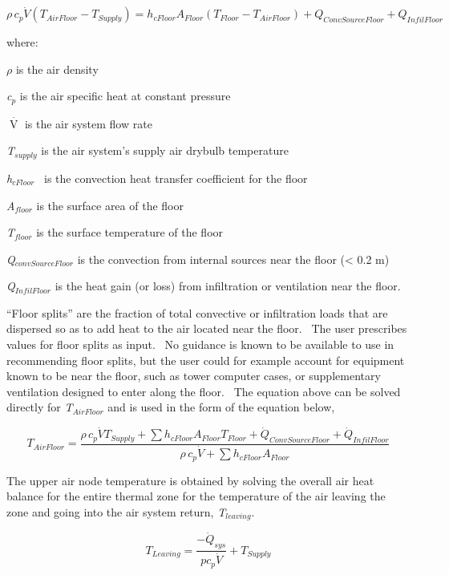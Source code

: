 \begin{equation}
\rho \,{c_p}\dot V({T_{AirFloor}} - {T_{Supply}}) = {h_{cFloor}}{A_{Floor}}({T_{Floor}} - {T_{AirFloor}}) + {Q_{ConvSourceFloor}} + {Q_{InfilFloor}}
\end{equation}

where:

\emph{\(\rho\)} is the air density

\emph{c\(_{p}\)} is the air specific heat at constant pressure

\(\mathop V\limits^\cdot\) is the air system flow rate

\emph{T\(_{supply}\)} is the air system's supply air drybulb temperature

\emph{h\(_{cFloor}\)} ~is the convection heat transfer coefficient for the floor

\emph{A\(_{floor}\)} is the surface area of the floor

\emph{T\(_{floor}\)} is the surface temperature of the floor

\emph{Q\(_{convSourceFloor}\)} is the convection from internal sources near the floor (\textless{} 0.2 m)

\emph{Q\(_{InfilFloor}\)} is the heat gain (or loss) from infiltration or ventilation near the floor.

``Floor splits'' are the fraction of total convective or infiltration loads that are dispersed so as to add heat to the air located near the floor.~ The user prescribes values for floor splits as input.~ No guidance is known to be available to use in recommending floor splits, but the user could for example account for equipment known to be near the floor, such as tower computer cases, or supplementary ventilation designed to enter along the floor.~ The equation above can be solved directly for \emph{T\(_{AirFloor}\)} and is used in the form of the equation below,

\begin{equation}
{T_{AirFloor}} = \frac{{\rho \,{c_p}\dot V{T_{Supply}} + \sum {{h_{cFloor}}{A_{Floor}}{T_{Floor}}}  + {{\dot Q}_{ConvSourceFloor}} + {{\dot Q}_{InfilFloor}}}}{{\rho \,{c_p}\dot V + \sum {{h_{cFloor}}{A_{Floor}}} }}
\end{equation}

The upper air node temperature is obtained by solving the overall air heat balance for the entire thermal zone for the temperature of the air leaving the zone and going into the air system return, \emph{T\(_{leaving}\)}.

\begin{equation}
{T_{Leaving}} = \frac{{ - {{\dot Q}_{sys}}}}{{p{c_p}\dot V}} + {T_{Supply}}
\end{equation}


